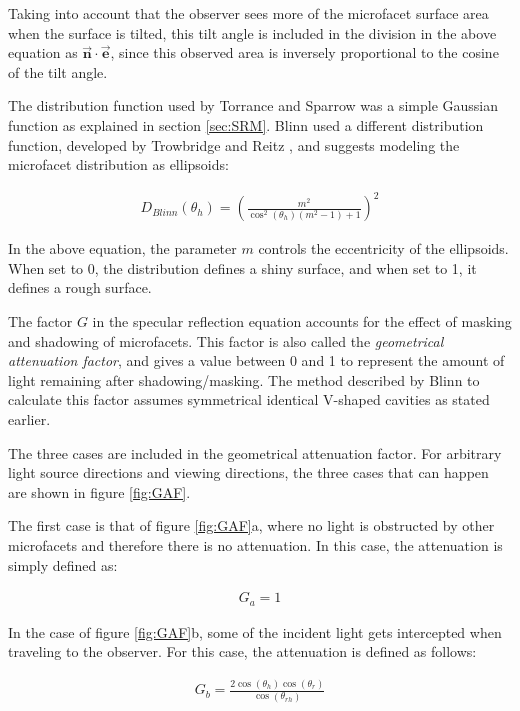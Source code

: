 Taking into account that the observer sees more of the microfacet surface area when the surface is tilted, this tilt angle is included in the division in the above equation as $\vec{\mathbf{n}} \cdot \vec{\mathbf{e}}$, since this observed area is inversely proportional to the cosine of the tilt angle.

The distribution function used by Torrance and Sparrow was a simple Gaussian function as explained in section \ref{sec:SRM}. Blinn used a different distribution function, developed by Trowbridge and Reitz \cite{TrowbridgeReitz}, and suggests modeling the microfacet distribution as ellipsoids:

	\begin{eqnarray*}
		D_{Blinn}(\theta_h) = \left({ \frac{m^2}{\cos^2(\theta_h)(m^2-1)+1} } \right)^2
	\end{eqnarray*}

\noindent In the above equation, the parameter $m$ controls the eccentricity of the ellipsoids. When set to 0, the distribution defines a shiny surface, and when set to 1, it defines a rough surface.

The factor $G$ in the specular reflection equation accounts for the effect of masking and shadowing of microfacets. This factor is also called the \textit{geometrical attenuation factor}, and gives a value between 0 and 1 to represent the amount of light remaining after shadowing/masking. The method described by Blinn to calculate this factor assumes symmetrical identical V-shaped cavities as stated earlier. 

The three cases are included in the geometrical attenuation factor. For arbitrary light source directions and viewing directions, the three cases that can happen are shown in figure \ref{fig:GAF}.

The first case is that of figure \ref{fig:GAF}a, where no light is obstructed by other microfacets and therefore there is no attenuation. In this case, the attenuation is simply defined as:

	\begin{eqnarray*}
		G_a = 1
	\end{eqnarray*}

In the case of figure \ref{fig:GAF}b, some of the incident light gets intercepted when traveling to the observer. For this case, the attenuation is defined as follows:

	\begin{eqnarray*}
		G_b = \frac{2\cos(\theta_h)\cos(\theta_r)}{\cos(\theta_{rh})}
	\end{eqnarray*}

